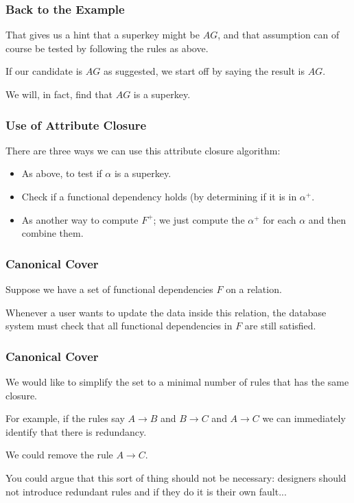 \begin{frame}
\frametitle{Back to the Example}

That gives us a hint that a superkey might be $AG$, and that assumption can of course be tested by following the rules as above.

If our candidate is $AG$ as suggested, we start off by saying the result is $AG$. 

We will, in fact, find that $AG$ is a superkey.

\end{frame}




\begin{frame}
\frametitle{Use of Attribute Closure}

There are three ways we can use this attribute closure algorithm:
\begin{itemize}
	\item As above, to test if $\alpha$ is a superkey.
	\item Check if a functional dependency holds (by determining if it is in $\alpha^{+}$.
	\item As another way to compute $F^{+}$; we just compute the $\alpha^{+}$ for each $\alpha$ and then combine them. 
\end{itemize}

\end{frame}



\begin{frame}
\frametitle{Canonical Cover}

Suppose we have a set of functional dependencies $F$ on a relation. 

Whenever a user wants to update the data inside this relation, the database system must check that all functional dependencies in $F$ are still satisfied. 

\end{frame}



\begin{frame}
\frametitle{Canonical Cover}

We would like to simplify the set to a minimal number of rules that has the same closure.

For example, if the rules say $A \rightarrow B$ and $B \rightarrow C$ and $A \rightarrow C$ we can immediately identify that there is redundancy. 

We could remove the rule $A \rightarrow C$.

You could argue that this sort of thing should not be necessary: designers should not introduce redundant rules and if they do it is their own fault...

\end{frame}



